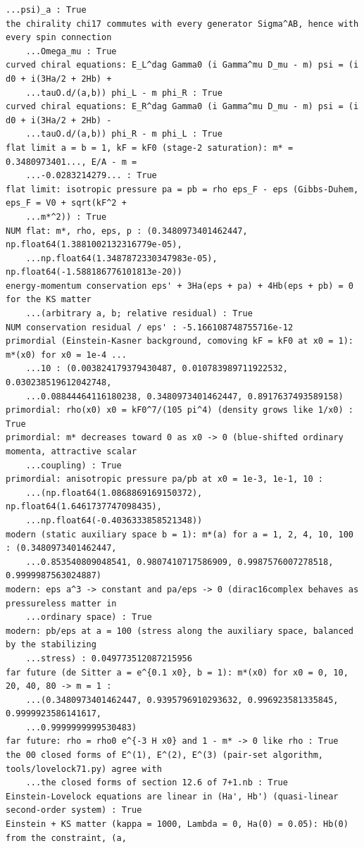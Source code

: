 \documentclass[10pt,a4paper]{article}
\begin{document}
\begin{Verbatim}[fontsize=\small,frame=single,framesep=2mm]
    ...psi)_a : True
the chirality chi17 commutes with every generator Sigma^AB, hence with every spin connection
    ...Omega_mu : True
curved chiral equations: E_L^dag Gamma0 (i Gamma^mu D_mu - m) psi = (i d0 + i(3Ha/2 + 2Hb) +
    ...tauO.d/(a,b)) phi_L - m phi_R : True
curved chiral equations: E_R^dag Gamma0 (i Gamma^mu D_mu - m) psi = (i d0 + i(3Ha/2 + 2Hb) -
    ...tauO.d/(a,b)) phi_R - m phi_L : True
flat limit a = b = 1, kF = kF0 (stage-2 saturation): m* = 0.3480973401..., E/A - m =
    ...-0.0283214279... : True
flat limit: isotropic pressure pa = pb = rho eps_F - eps (Gibbs-Duhem, eps_F = V0 + sqrt(kF^2 +
    ...m*^2)) : True
NUM flat: m*, rho, eps, p : (0.3480973401462447, np.float64(1.3881002132316779e-05),
    ...np.float64(1.3487872330347983e-05), np.float64(-1.588186776101813e-20))
energy-momentum conservation eps' + 3Ha(eps + pa) + 4Hb(eps + pb) = 0 for the KS matter
    ...(arbitrary a, b; relative residual) : True
NUM conservation residual / eps' : -5.166108748755716e-12
primordial (Einstein-Kasner background, comoving kF = kF0 at x0 = 1): m*(x0) for x0 = 1e-4 ...
    ...10 : (0.003824179379430487, 0.010783989711922532, 0.030238519612042748,
    ...0.08844464116180238, 0.3480973401462447, 0.8917637493589158)
primordial: rho(x0) x0 = kF0^7/(105 pi^4) (density grows like 1/x0) : True
primordial: m* decreases toward 0 as x0 -> 0 (blue-shifted ordinary momenta, attractive scalar
    ...coupling) : True
primordial: anisotropic pressure pa/pb at x0 = 1e-3, 1e-1, 10 :
    ...(np.float64(1.0868869169150372), np.float64(1.6461737747098435),
    ...np.float64(-0.4036333858521348))
modern (static auxiliary space b = 1): m*(a) for a = 1, 2, 4, 10, 100 : (0.3480973401462447,
    ...0.853540809048541, 0.9807410717586909, 0.9987576007278518, 0.9999987563024887)
modern: eps a^3 -> constant and pa/eps -> 0 (dirac16complex behaves as pressureless matter in
    ...ordinary space) : True
modern: pb/eps at a = 100 (stress along the auxiliary space, balanced by the stabilizing
    ...stress) : 0.049773512087215956
far future (de Sitter a = e^{0.1 x0}, b = 1): m*(x0) for x0 = 0, 10, 20, 40, 80 -> m = 1 :
    ...(0.3480973401462447, 0.9395796910293632, 0.996923581335845, 0.9999923586141617,
    ...0.9999999999530483)
far future: rho = rho0 e^{-3 H x0} and 1 - m* -> 0 like rho : True
the 00 closed forms of E^(1), E^(2), E^(3) (pair-set algorithm, tools/lovelock71.py) agree with
    ...the closed forms of section 12.6 of 7+1.nb : True
Einstein-Lovelock equations are linear in (Ha', Hb') (quasi-linear second-order system) : True
Einstein + KS matter (kappa = 1000, Lambda = 0, Ha(0) = 0.05): Hb(0) from the constraint, (a,

\end{Verbatim}
\end{document}
